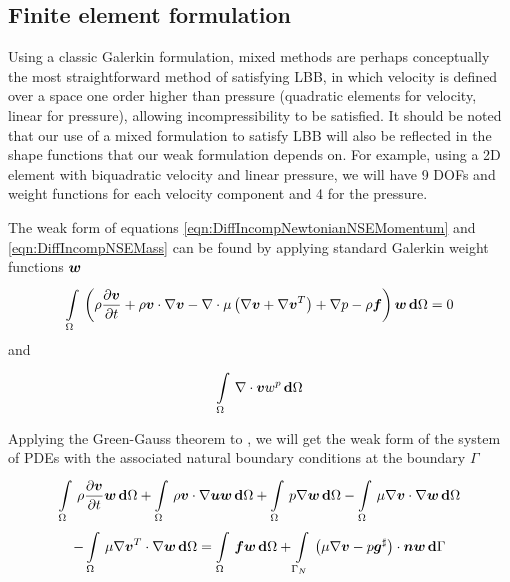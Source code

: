 \subsection{Finite element formulation}

Using a classic Galerkin formulation, mixed methods are perhaps conceptually
the most straightforward method of satisfying LBB, in which velocity is
defined over a space one order higher than pressure (\eg quadratic elements
for velocity, linear for pressure), allowing incompressibility to be
satisfied. It should be noted that our use of a mixed formulation to satisfy
LBB will also be reflected in the shape functions that our weak formulation
depends on. For example, using a 2D element with biquadratic velocity and
linear pressure, we will have 9 DOFs and weight functions for each velocity
component and 4 for the pressure.

The weak form of equations \ref{eqn:DiffIncompNewtonianNSEMomentum} and
\ref{eqn:DiffIncompNSEMass} can be found by applying standard Galerkin weight
functions $\boldsymbol{w}$ \ie
\begin{equation}
  \gint{\Omega}{}{\pbrac{\rho\delby{\vectr{v}}{t}+\dotprod{\rho\vectr{v}}{\gradient{}{\vectr{v}}}
      -\divergence{}{\mu\pbrac{\gradient{}{\vectr{v}+\transpose{\gradient{}{\vectr{v}}}}}}+\gradient{}{p}
      -\rho\vectr{f}}{\vectr{w}}}{\Omega} = 0
 \label{eqn:BasicGalerkinNSEMomentum}
\end{equation}
and
\begin{equation}
  \gint{\Omega}{}{\divergence{}{\vectr{v}}w^{p}}{\Omega}
 \label{eqn:BasicGalerkinNSEMass}
\end{equation}

Applying the Green-Gauss theorem to
, we will get
the weak form of the system of PDEs with the associated natural boundary
conditions at the boundary $\Gamma$ \ie
\begin{multline}
  \gint{\Omega}{}{\rho\delby{\vectr{v}}{t}{\vectr{w}}}{\Omega}
  +\gint{\Omega}{}{\dotprod{\rho\vectr{v}}{\gradient{}{\vectr{u}}}\vectr{w}}{\Omega}
  +\gint{\Omega}{}{p\gradient{}{\vectr{w}}}{\Omega}
  -\gint{\Omega}{}{\dotprod{\mu\gradient{}{\vectr{v}}}{\gradient{}{\vectr{w}}}}{\Omega} \\
  -\gint{\Omega}{}{\dotprod{\mu\gradient{}{\transpose{\vectr{v}}}}{\gradient{}{\vectr{w}}}}{\Omega}
  =\gint{\Omega}{}{\vectr{f}\vectr{w}}{\Omega}
  +\gint{\Gamma_{N}}{}{\dotprod{\pbrac{\mu\gradient{}{\vectr{v}-p\sharptensor{\vectr{g}}}}}{\vectr{n}}\vectr{w}}{\Gamma}
  \label{eqn:GalerkinNSE}
\end{multline}

